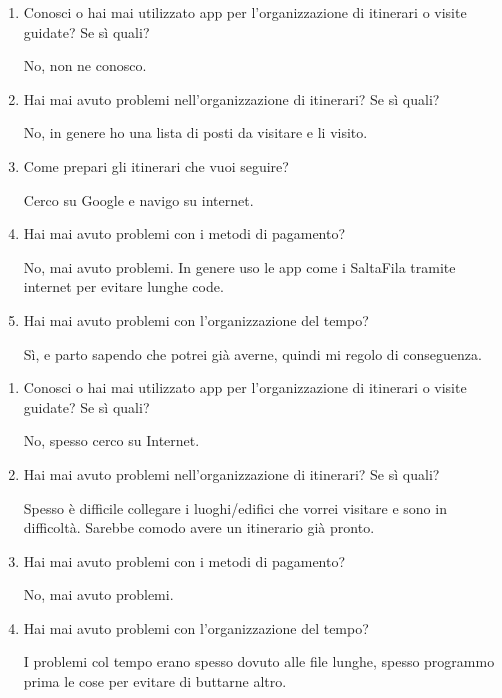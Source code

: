 \begin{enumerate}

\item Conosci o hai mai utilizzato app per l'organizzazione di itinerari o visite guidate? Se sì quali?

No, non ne conosco.

\item Hai mai avuto problemi nell'organizzazione di itinerari? Se sì quali?

No, in genere ho una lista di posti da visitare e li visito.

\item Come prepari gli itinerari che vuoi seguire?

Cerco su Google e navigo su internet.

\item Hai mai avuto problemi con i metodi di pagamento?

No, mai avuto problemi. In genere uso le app come i SaltaFila tramite internet per evitare lunghe code.

\item Hai mai avuto problemi con l'organizzazione del tempo?

Sì, e parto sapendo che potrei già averne, quindi mi regolo di conseguenza.

\end{enumerate}

\clearpage
{}

\begin{enumerate}

\item Conosci o hai mai utilizzato app per l'organizzazione di itinerari o visite guidate? Se sì quali?

No, spesso cerco su Internet.

\item Hai mai avuto problemi nell'organizzazione di itinerari? Se sì quali?

Spesso è difficile collegare i luoghi/edifici che vorrei visitare e sono in difficoltà. Sarebbe comodo avere un itinerario già pronto.

\item Hai mai avuto problemi con i metodi di pagamento?

No, mai avuto problemi.

\item Hai mai avuto problemi con l'organizzazione del tempo?

I problemi col tempo erano spesso dovuto alle file lunghe, spesso programmo prima le cose per evitare di buttarne altro.

\end{enumerate}

